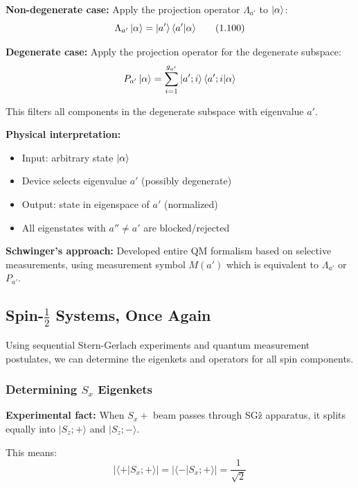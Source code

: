 \documentclass[11pt,a4paper]{article}
\begin{document}
\textbf{Non-degenerate case:} Apply the projection operator $\Lambda_{a'}$ to $\ket{\alpha}$:
\begin{equation}
\Lambda_{a'}\ket{\alpha} = \ket{a'}\langle a'|\alpha\rangle
\tag{1.100}
\end{equation}

\textbf{Degenerate case:} Apply the projection operator for the degenerate subspace:
\begin{equation}
P_{a'}\ket{\alpha} = \sum_{i=1}^{g_{a'}}\ket{a'; i}\langle a'; i|\alpha\rangle
\end{equation}

This filters all components in the degenerate subspace with eigenvalue $a'$.

\textbf{Physical interpretation:}
\begin{itemize}
\item Input: arbitrary state $\ket{\alpha}$
\item Device selects eigenvalue $a'$ (possibly degenerate)
\item Output: state in eigenspace of $a'$ (normalized)
\item All eigenstates with $a'' \neq a'$ are blocked/rejected
\end{itemize}

\textbf{Schwinger's approach:} Developed entire QM formalism based on selective measurements, using measurement symbol $M(a')$ which is equivalent to $\Lambda_{a'}$ or $P_{a'}$.

\subsection{Spin-$\frac{1}{2}$ Systems, Once Again}

Using sequential Stern-Gerlach experiments and quantum measurement postulates, we can determine the eigenkets and operators for all spin components.

\subsubsection{Determining $S_x$ Eigenkets}

\textbf{Experimental fact:} When $S_x+$ beam passes through SGẑ apparatus, it splits equally into $|S_z; +\rangle$ and $|S_z; -\rangle$.

This means:
\begin{equation}
|\langle +|S_x; +\rangle| = |\langle -|S_x; +\rangle| = \frac{1}{\sqrt{2}}
\tag{1.101}
\end{equation}
\end{document}

